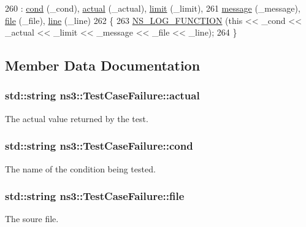 \begin{DoxyCode}
260   : \hyperlink{structns3_1_1TestCaseFailure_ac0d5c925c226440de69d3446bb3b57be}{cond} (\_cond), \hyperlink{structns3_1_1TestCaseFailure_a0c0a29e84c112f65b5c024ef5f1d1b56}{actual} (\_actual), \hyperlink{structns3_1_1TestCaseFailure_adfcc28f97df7dce78629ee21d11e1f41}{limit} (\_limit),
261     \hyperlink{structns3_1_1TestCaseFailure_a293e13164cefcd1f8758eada2018fa0d}{message} (\_message), \hyperlink{structns3_1_1TestCaseFailure_a0c6ec0124617a83d9fa69e9f788e2065}{file} (\_file), \hyperlink{structns3_1_1TestCaseFailure_a49a39a3dea2bc673abf2fedf78f67ebe}{line} (\_line)
262 \{
263   \hyperlink{log-macros-disabled_8h_a90b90d5bad1f39cb1b64923ea94c0761}{NS\_LOG\_FUNCTION} (\textcolor{keyword}{this} << \_cond << \_actual << \_limit << \_message << \_file << \_line);
264 \}
\end{DoxyCode}


\subsection{Member Data Documentation}
\subsubsection[{\texorpdfstring{actual}{actual}}]{\setlength{\rightskip}{0pt plus 5cm}std\+::string ns3\+::\+Test\+Case\+Failure\+::actual}\hypertarget{structns3_1_1TestCaseFailure_a0c0a29e84c112f65b5c024ef5f1d1b56}{}\label{structns3_1_1TestCaseFailure_a0c0a29e84c112f65b5c024ef5f1d1b56}
The actual value returned by the test. 
\subsubsection[{\texorpdfstring{cond}{cond}}]{\setlength{\rightskip}{0pt plus 5cm}std\+::string ns3\+::\+Test\+Case\+Failure\+::cond}\hypertarget{structns3_1_1TestCaseFailure_ac0d5c925c226440de69d3446bb3b57be}{}\label{structns3_1_1TestCaseFailure_ac0d5c925c226440de69d3446bb3b57be}
The name of the condition being tested. 
\subsubsection[{\texorpdfstring{file}{file}}]{\setlength{\rightskip}{0pt plus 5cm}std\+::string ns3\+::\+Test\+Case\+Failure\+::file}\hypertarget{structns3_1_1TestCaseFailure_a0c6ec0124617a83d9fa69e9f788e2065}{}\label{structns3_1_1TestCaseFailure_a0c6ec0124617a83d9fa69e9f788e2065}
The soure file. 
